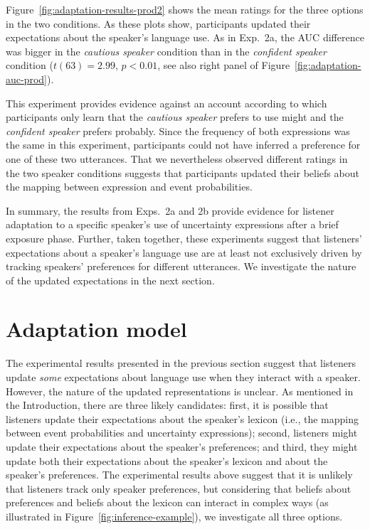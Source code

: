 \documentclass[man, floatsintext]{apa6}
\newcommand{\figref}[1]{Figure~\ref{#1}}
\begin{document}
Figure~\ref{fig:adaptation-results-prod2} shows the mean ratings for the three options in the two conditions. As these plots show, participants updated their expectations about the speaker's language use. As in Exp.~2a, the
AUC difference was bigger in the \emph{cautious speaker} condition than in the \emph{confident speaker} condition ($t(63) = 2.99$, $p < 0.01$, see also right panel of \figref{fig:adaptation-auc-prod}). 

This experiment provides evidence against an account according to which participants only learn that the \emph{cautious speaker} prefers to use {\sc might} and the {\it confident speaker} prefers {\sc probably}. 
Since the frequency of both expressions was the same in this experiment, participants could not have inferred a preference for one of these two utterances. That we nevertheless observed different ratings in the two speaker conditions suggests that participants updated their beliefs about the mapping between expression and event probabilities.

In summary, the results from Exps.~2a and 2b provide evidence for listener adaptation to a specific speaker's use of uncertainty expressions after a brief exposure phase. Further, taken together, these experiments
suggest that listeners' expectations about a speaker's language use are at least not exclusively driven by tracking speakers' preferences for different utterances. We investigate the nature of the updated expectations
in the next section.


% 

\section{Adaptation model}
\label{sec:model-adapt}



The experimental results presented in the previous section suggest that listeners update
\textit{some} expectations about language use when they interact with a speaker. 
However, the nature of the updated representations is unclear. As mentioned in the Introduction, there are three likely candidates:
first, it is possible that listeners update their expectations about the speaker's lexicon 
(i.e., the mapping between event probabilities and uncertainty expressions);  second, listeners
 might  update their expectations about the speaker's preferences; 
and third, they might update both their expectations about the speaker's lexicon 
and about the speaker's preferences. The experimental results above suggest that it is unlikely that listeners track only speaker preferences, but considering
that beliefs about preferences and beliefs about the lexicon can interact in complex ways (as illustrated in \figref{fig:inference-example}), we investigate all three options.
\end{document}
